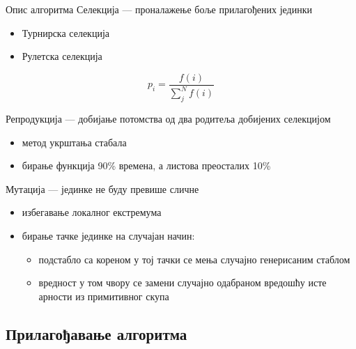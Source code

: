 \documentclass{beamer}
\begin{document}
\begin{frame}{Опис алгоритма}
    Селекција — проналажење боље прилагођених јединки
    \begin{minipage}{0.5\textwidth}
        \begin{itemize}
            \item Турнирска селекција
            \item Рулетска селекција
        \end{itemize}
    \end{minipage}
    \begin{minipage}{0.45\textwidth}\raggedleft
        \begin{equation*}
            p_i = \frac{f(i)}{\sum_{j}^{N} f(i)}
        \end{equation*}
    \end{minipage}
    Репродукција — добијање потомства од два родитеља добијених селекцијом
    \begin{itemize}
        \item метод укрштања стабала
        \item бирање функција 90\% времена, а листова преосталих 10\% 
    \end{itemize}
    Мутација — јединке не буду превише сличне 
    \begin{itemize}
        \item избегавање локалног екстремума
        \item бирање тачке јединке на случајан начин:
        \begin{itemize}
            \item подстабло са кореном у тој тачки се мења случајно генерисаним стаблом
            \item вредност у том чвору се замени случајно одабраном вредошћу исте арности из примитивног скупа
        \end{itemize}
    \end{itemize}
\end{frame}

\subsection[Прилагођавање алгоритма]{Прилагођавање алгоритма}
    
\end{document}
